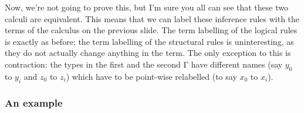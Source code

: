 \documentclass[12pt,t]{beamer}
\begin{document}
\begin{frame}
{    Now, we're not going to prove this, but I'm sure you all can see
    that these two calculi are equivalent. This means that we can
    label these inference rules with the terms of the calculus on the
    previous slide. The term labelling of the logical rules is exactly
    as before; the term labelling of the structural rules is
    uninteresting, as they do not actually change anything in the
    term. The only exception to this is contraction: the types in the
    first and the second Γ have different names (say $y_0$ to $y_i$
    and $z_0$ to $z_i$) which have to be point-wise relabelled (to say
    $x_0$ to $x_i$).
  }
\end{frame}

\begin{frame}
  \frametitle{An example}
  \centering
  \vfill
\end{frame}
\end{document}
